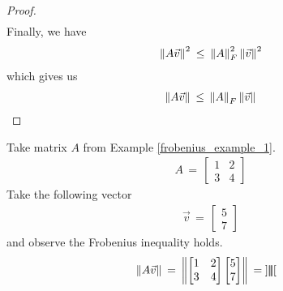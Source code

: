 \begin{proof}
\begin{align*}
    \end{align*}
    Finally, we have
    \begin{align*}
        \left\lVert A\vec{v}\right\rVert^{2} \hspace{2pt} \leq \hspace{2pt} \left\lVert A\right\rVert_{F}^{2} \left\lVert\vec{v}\right\rVert^{2}
    \end{align*}
    which gives us
    \begin{align*}
        \left\lVert A\vec{v}\right\rVert \hspace{2pt} \leq \hspace{2pt} \left\lVert A\right\rVert_{F} \left\lVert\vec{v}\right\rVert
    \end{align*}
\end{proof}

\begin{example}
    Take matrix $A$ from Example \ref{frobenius_example_1}.
    \begin{align*}
        A \hspace{2pt} = \hspace{2pt}
        \begin{bmatrix}
            1 & 2\\
            3 & 4
        \end{bmatrix}
    \end{align*}
    Take the following vector
    \begin{align*}
        \vec{v} \hspace{2pt} = \hspace{2pt}
        \begin{bmatrix}
            5\\
            7
        \end{bmatrix}
    \end{align*}
    and observe the Frobenius inequality holds.
    \begin{align*}
        \left\lVert A\vec{v}\right\rVert \hspace{2pt} &= \hspace{2pt} \left\lVert
        \begin{bmatrix}
            1 & 2\\
            3 & 4
        \end{bmatrix}
        \begin{bmatrix}
            5\\
            7
        \end{bmatrix}
        \right\rVert \hspace{2pt} = \hspace{2pt} \left\lVert
        \begin{bmatrix}

\end{bmatrix}\right\rVert
\end{align*}
\end{example}
